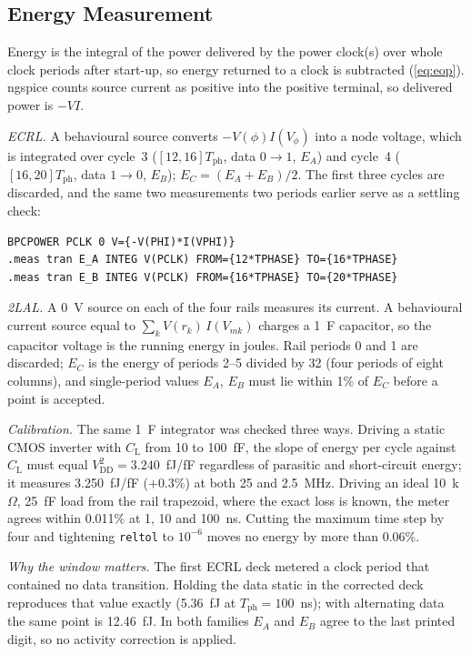 \documentclass[conference]{IEEEtran}
\newcommand{\VDD}{V_{\mathrm{DD}}}
\newcommand{\CL}{C_{\mathrm{L}}}
\newcommand{\Tph}{T_{\mathrm{ph}}}
\begin{document}
\subsection{Energy Measurement}
\label{sec:meas}
Energy is the integral of the power delivered by the power clock(s) over
whole clock periods after start-up, so energy returned to a clock is
subtracted (\cref{eq:eop}). ngspice counts source current as positive into
the positive terminal, so delivered power is $-VI$.

\emph{ECRL.} A behavioural source converts $-V(\phi)I(V_\phi)$ into a node
voltage, which is integrated over cycle~3 ($[12,16]\Tph$, data $0\to1$, $E_A$)
and cycle~4 ($[16,20]\Tph$, data $1\to0$, $E_B$); $E_C=(E_A+E_B)/2$. The first
three cycles are discarded, and the same two measurements two periods
earlier serve as a settling check:
\begin{lstlisting}
BPCPOWER PCLK 0 V={-V(PHI)*I(VPHI)}
.meas tran E_A INTEG V(PCLK) FROM={12*TPHASE} TO={16*TPHASE}
.meas tran E_B INTEG V(PCLK) FROM={16*TPHASE} TO={20*TPHASE}
\end{lstlisting}

\emph{2LAL.} A 0~V source on each of the four rails measures its current. A
behavioural current source equal to $\sum_k V(r_k)\,I(V_{mk})$ charges a
1~F capacitor, so the capacitor voltage is the running energy in joules. Rail
periods 0 and 1 are discarded; $E_C$ is the energy of periods 2--5 divided by
32 (four periods of eight columns), and single-period values $E_A$, $E_B$
must lie within 1\% of $E_C$ before a point is accepted.

\emph{Calibration.} The same 1~F integrator was checked three ways. Driving
a static CMOS inverter with $\CL$ from 10 to 100~fF, the slope of energy per
cycle against $\CL$ must equal $\VDD^2=3.240$~fJ/fF regardless of parasitic
and short-circuit energy; it measures 3.250~fJ/fF ($+0.3\%$) at both 25 and
2.5~MHz. Driving an ideal 10~k$\Omega$, 25~fF load from the rail trapezoid,
where the exact loss is known, the meter agrees within 0.011\% at 1, 10 and
100~ns. Cutting the maximum time step by four and tightening \texttt{reltol}
to $10^{-6}$ moves no energy by more than 0.06\%.

\emph{Why the window matters.} The first ECRL deck metered a clock period
that contained no data transition. Holding the data static in the corrected
deck reproduces that value exactly (5.36~fJ at $\Tph=100$~ns); with
alternating data the same point is 12.46~fJ. In both families $E_A$ and $E_B$
agree to the last printed digit, so no activity correction is applied.
\end{document}
